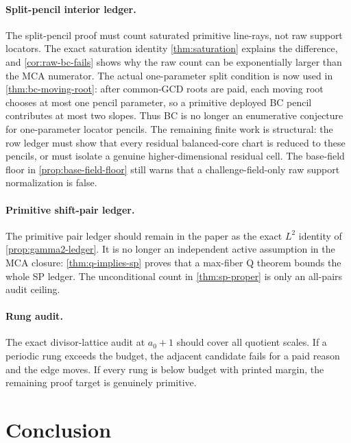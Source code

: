 \documentclass[a4paper,11pt]{amsart}
\theoremstyle{remark}
\begin{document}
\paragraph{Split-pencil interior ledger.}  The split-pencil proof must count saturated primitive line-rays, not raw support locators.  The exact saturation identity \cref{thm:saturation} explains the difference, and \cref{cor:raw-bc-fails} shows why the raw count can be exponentially larger than the MCA numerator.  The actual one-parameter split condition is now used in \cref{thm:bc-moving-root}: after common-GCD roots are paid, each moving root chooses at most one pencil parameter, so a primitive deployed BC pencil contributes at most two slopes.  Thus BC is no longer an enumerative conjecture for one-parameter locator pencils.  The remaining finite work is structural: the row ledger must show that every residual balanced-core chart is reduced to these pencils, or must isolate a genuine higher-dimensional residual cell.  The base-field floor in \cref{prop:base-field-floor} still warns that a challenge-field-only raw support normalization is false.

\paragraph{Primitive shift-pair ledger.}  The primitive pair ledger should remain in the paper as the exact \(L^2\) identity of \cref{prop:gamma2-ledger}.  It is no longer an independent active assumption in the MCA closure: \cref{thm:q-implies-sp} proves that a max-fiber Q theorem bounds the whole SP ledger.  The unconditional count in \cref{thm:sp-proper} is only an all-pairs audit ceiling.

\paragraph{Rung audit.}  The exact divisor-lattice audit at \(a_0+1\) should cover all quotient scales.  If a periodic rung exceeds the budget, the adjacent candidate fails for a paid reason and the edge moves.  If every rung is below budget with printed margin, the remaining proof target is genuinely primitive.

\section{Conclusion}
\end{document}
